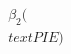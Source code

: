 \documentclass[preview]{standalone}
\begin{document}
\begin{align*}
\beta_2(\\text{PIE})
\end{align*}
\end{document}
